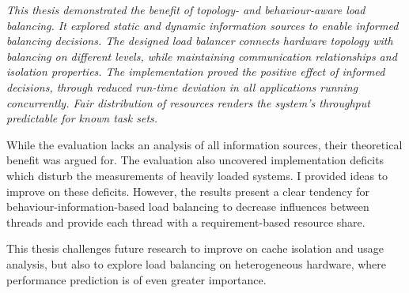 {\itshape
This thesis demonstrated the benefit of topology- and behaviour-aware load balancing.
It explored static and dynamic information sources to enable informed balancing
decisions.
The designed load balancer connects hardware topology with balancing on
different levels, while maintaining communication relationships and isolation
properties.
The implementation proved the positive effect of informed decisions,
through reduced run-time deviation in all applications running concurrently.
Fair distribution of resources renders the system's throughput predictable for
known task sets.

While the evaluation lacks an analysis of all information sources, their
theoretical benefit was argued for.
The evaluation also uncovered implementation deficits which disturb the
measurements of heavily loaded systems.
I provided ideas to improve on these deficits.
However, the results present a clear tendency for behaviour-information-based
load balancing to decrease influences between threads and provide each thread
with a requirement-based resource share.

This thesis challenges future research to improve on cache isolation and usage
analysis, but also to explore load balancing on heterogeneous hardware, where
performance prediction is of even greater importance.
\/}


\cleardoublepage


